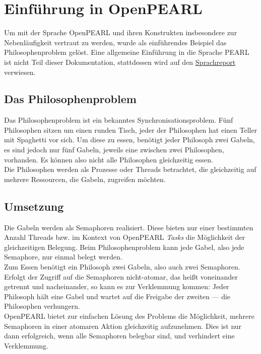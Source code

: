\chapter{Einführung in OpenPEARL}

Um mit der Sprache OpenPEARL und ihren Konstrukten insbesondere zur Nebenläufigkeit vertraut zu werden, wurde als einführendes Beispiel das Philosophenproblem gelöst. Eine allgemeine Einführung in die Sprache PEARL ist nicht Teil dieser Dokumentation, stattdessen wird auf den
\href{http://www.real-time.de/misc/PEARL90-Sprachreport-V2.0-GI-1995-de.pdf}{Sprachreport} verwiesen.

\section{Das Philosophenproblem}
	Das Philosophenproblem ist ein bekanntes Synchronisationsproblem. Fünf Philosophen sitzen um einen runden Tisch, jeder der Philosophen hat einen Teller mit Spaghetti vor sich. Um diese zu essen, benötigt jeder Philosoph zwei Gabeln, es sind jedoch nur fünf Gabeln, jeweils eine zwischen zwei Philosophen, vorhanden. Es können also nicht alle Philosophen gleichzeitig essen.\\
	Die Philosophen werden als Prozesse oder Threads betrachtet, die gleichzeitig auf mehrere Ressourcen, die Gabeln, zugreifen möchten.
	
\section{Umsetzung}
	Die Gabeln werden als Semaphoren realisiert. Diese bieten nur einer bestimmten Anzahl Threads bzw. im Kontext von OpenPEARL \emph{Tasks} die Möglichkeit der gleichzeitigen Belegung. Beim Philosophenproblem kann jede Gabel, also jede Semaphore, nur einmal belegt werden.\\
	Zum Essen benötigt ein Philosoph zwei Gabeln, also auch zwei Semaphoren. Erfolgt der Zugriff auf die Semaphoren nicht-atomar, das heißt voneinander getrennt und nacheinander, so kann es zur Verklemmung kommen: Jeder Philosoph hält eine Gabel und wartet auf die Freigabe der zweiten --- die Philosophen verhungern.\\
	OpenPEARL bietet zur einfachen Lösung des Problems die Möglichkeit, mehrere Semaphoren in einer atomaren Aktion gleichzeitig aufzunehmen. Dies ist nur dann erfolgreich, wenn alle Semaphoren belegbar sind, und verhindert eine Verklemmung.

\newpage

